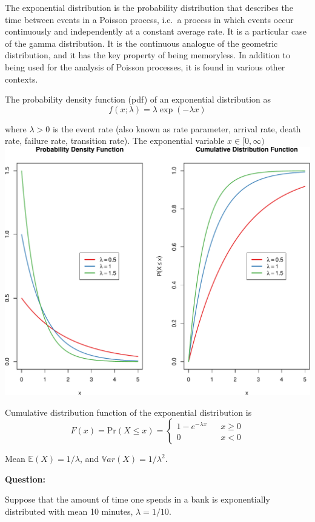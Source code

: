 \documentclass[]{article}
\numberwithin{equation}{section}
\begin{document}
The exponential distribution is the probability distribution that
describes the time between events in a Poisson process, i.e.~a process
in which events occur continuously and independently at a constant
average rate. It is a particular case of the gamma distribution. It is
the continuous analogue of the geometric distribution, and it has the
key property of being memoryless. In addition to being used for the
analysis of Poisson processes, it is found in various other contexts.

The probability density function (pdf) of an exponential distribution as
\[
f(x;\lambda) =  \lambda \exp(-\lambda x)
\]

where \(\lambda>0\) is the event rate (also known as rate parameter,
arrival rate, death rate, failure rate, transition rate). The
exponential variable \(x \in [0,\infty)\)
\includegraphics{index_files/figure-latex/unnamed-chunk-149-1.pdf}

Cumulative distribution function of the exponential distribution is \[
F(x) = \mbox{Pr}(X\leq x) = 
  \left\{
    \begin{array}{lcc}
      1- e^{-\lambda x} & & x\geq 0 \\
      0                 & & x < 0
    \end{array}
  \right.
\]

Mean \(\mathbb{E}(X) = 1/\lambda\), and
\(\mathbb{V}ar(X) = 1/\lambda^2\).

\textbf{Question:}

Suppose that the amount of time one spends in a bank is exponentially
distributed with mean 10 minutes, \(\lambda=1/10\).
\end{document}
